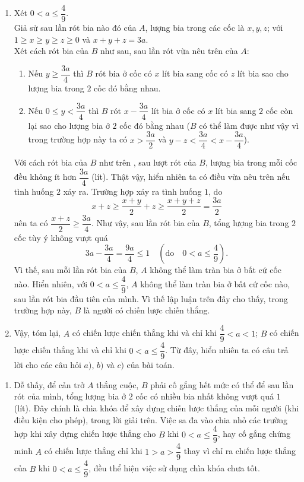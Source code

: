 \begin{bt}
{\begin{enumerate}[$\bullet$]
Như vậy nếu $1>a>\dfrac{4}{9}$ thì $A$ là người có chiến lược thắng.
\item Xét $0<a\leq\dfrac{4}{9}$.\\
Giả sử sau lần rót bia nào đó của $A$, lượng bia trong các cốc là $x, y, z$; với $1\geq x\geq y\geq z\geq 0$ và $x+y+z=3a$.\\
Xét cách rót bia của $B$ như sau, sau lần rót vừa nêu trên của $A$:
\begin{enumerate}
\item Nếu $y\geq\dfrac{3a}{4}$ thì $B$ rót bia ở cốc có $x$ lít bia sang cốc có $z$ lít bia sao cho lượng bia trong $2$ cốc đó bằng nhau.\\
\item Nếu $0\leq y<\dfrac{3a}{4}$ thì $B$ rót $x-\dfrac{3a}{4}$ lít bia ở cốc có $x$ lít bia sang $2$ cốc còn lại sao cho  lượng bia ở $2$ cốc đó bằng nhau ($B$ có thể làm được như vậy vì trong trường hợp này ta có $x>\dfrac{3a}{2}$ và $y-z<\dfrac{3a}{4}<x-\dfrac{3a}{4}$).
    \end{enumerate}
Với cách rót bia của $B$ như trên , sau lượt rót của $B$, lượng bia trong mỗi cốc đều không ít hơn $\dfrac{3a}{4}$ (lít).
Thật vậy, hiển nhiên ta có điều vừa nêu trên nếu tình huống $2$ xảy ra. Trường hợp xảy ra tình huống $1$, do
$$x+z\geq\dfrac{x+y}{2}+z\geq\dfrac{x+y+z}{2}=\dfrac{3a}{2}$$
nên ta có $\dfrac{x+z}{2}\geq\dfrac{3a}{4}$.
Như vậy, sau lần rót bia của $B$, tổng lượng bia trong $2$ cốc tùy ý không vượt quá
$$3a-\dfrac{3a}{4}=\dfrac{9a}{4}\leq 1\quad\left(\text{do}\quad 0<a\leq\dfrac{4}{9} \right).$$
Vì thế, sau mỗi lần rót bia của $B$, $A$ không thể làm tràn bia ở bất cứ cốc nào.
Hiển nhiên, với $0<a\leq\dfrac{4}{9}$, $A$ không thể làm tràn bia ở bất cứ cốc nào, sau lần rót bia đầu tiên của mình. Vì thế lập luận trên đây cho thấy, trong trường hợp này, $B$  là người có chiến lược chiến thắng.
 \item Vậy, tóm lại, $A$ có chiến lược chiến thắng khi và chỉ khi $\dfrac{4}{9}<a<1$; $B$ có chiến lược chiến thắng khi và chỉ khi $0<a\leq\dfrac{4}{9}$. Từ đây, hiển nhiên ta có câu trả lời cho các câu hỏi $a)$, $b)$ và $c)$ của bài toán.
     \end{enumerate}
\begin{nx}\hfill
\begin{enumerate}[\bf 1.]
\item Dễ thấy, để cản trở $A$ thắng cuộc, $B$ phải cố gắng hết mức có thể để sau lần rót của mình, tổng lượng bia ở $2$ cốc có nhiều bia nhất không vượt quá $1$ (lít). Đây chính là chìa khóa để xây dựng chiến lược thắng của mỗi người (khi điều kiện cho phép), trong lời giải trên. Việc sa đa vào chia nhỏ các trường hợp khi xây dựng chiến lược thắng cho $B$ khi $0<a\leq\dfrac{4}{9}$, hay cố gắng chứng minh $A$ có chiến lược thắng chỉ khi  $1>a>\dfrac{4}{9}$ thay vì chỉ ra chiến lược thắng của $B$ khi $0<a\leq\dfrac{4}{9}$, đều thể hiện việc sử dụng chìa khóa chưa tốt.

\end{enumerate}
\end{nx}}
\end{bt}
